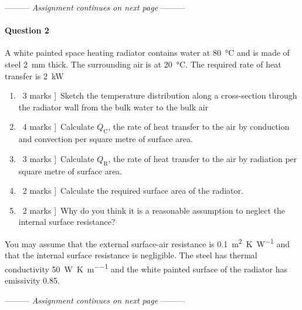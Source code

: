 \documentclass[a4paper,12pt,fleqn]{article}
\newcommand{\middlewords}{Assignment continues on next page}
\begin{document}
\begin{center}
\vspace{3cm}
--------- \textit{\middlewords} ---------
\end{center}


\newpage
\paragraph{\textbf{Question 2}}
A white painted space heating radiator contains water at \SI{80}{\celsius} and is made of steel \SI{2}{\milli\metre} thick. The surrounding air is at \SI{20}{\celsius}. The required rate of heat transfer is \SI{2}{\kilo\watt}

\begin{enumerate}[label=\alph*)]
\item \lbrack\ 3 marks ]\ Sketch the temperature distribution along a cross-section through the radiator wall from the bulk water to the bulk air
\item \lbrack\ 4 marks ]\ Calculate $Q_\mathrm{C}$, the rate of heat transfer to the air by conduction and  convection per square metre of surface area.
\item \lbrack\ 3 marks ]\ Calculate $Q_\mathrm{R}$,  the rate of heat transfer to the air by radiation per square metre of surface area.
\item \lbrack\ 2 marks ]\ Calculate the required surface area of the radiator.
\item \lbrack\ 2 marks ]\ Why do you think it is a reasonable assumption to neglect the internal surface resistance?
\end{enumerate}

You may assume that the external surface-air resistance is \SI{0.1} {\metre\squared\kelvin\per\watt} and that the internal surface resistance is negligible. The steel has thermal conductivity \SI{50}{\watt\per\kelvin\per\metre} and the white painted surface of the radiator has emissivity 0.85.

\begin{center}
\vspace{3cm}
--------- \textit{\middlewords} ---------
\end{center}

\newpage
\end{document}
